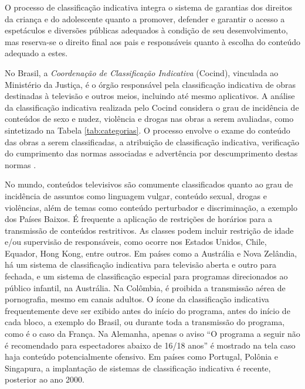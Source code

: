 
O processo de classificação indicativa integra o sistema de garantias dos direitos da criança e do adolescente quanto a promover, defender e garantir o acesso a espetáculos e diversões públicas adequados à condição de seu desenvolvimento, mas reserva-se o direito final aos pais e responsáveis quanto à escolha do conteúdo adequado a estes\cite{eca}.

No Brasil, a \emph{Coordenação de Classificação Indicativa} (Cocind), vinculada ao Ministério da Justiça, é o órgão responsável pela classificação indicativa de obras destinadas à televisão e outros meios, incluindo até mesmo aplicativos. A análise da classificação indicativa realizada pelo Cocind considera o grau de incidência de conteúdos de sexo e nudez, violência e drogas nas obras a serem avaliadas, como sintetizado na Tabela \ref{tab:categorias}. O processo envolve o exame do conteúdo das obras a serem classificadas, a atribuição de classificação indicativa, verificação do cumprimento das normas associadas e advertência por descumprimento destas normas \cite{portaria:ci}.




No mundo, conteúdos televisivos são comumente classificados quanto ao grau de incidência de assuntos como linguagem vulgar, conteúdo sexual, drogas e violências, além de temas como conteúdo perturbador e discriminação, a exemplo dos Países Baixos. É frequente a aplicação de restrições de horários para a transmissão de conteúdos restritivos. As classes podem incluir restrição de idade e/ou supervisão de responsáveis, como ocorre nos Estados Unidos, Chile, Equador, Hong Kong, entre outros. Em países como a Austrália e Nova Zelândia, há um sistema de classificação indicativa para televisão aberta e outro para fechada, e um sistema de classificação especial para programas direcionados ao público infantil, na Austrália. Na Colômbia, é proibida a transmissão aérea de pornografia, mesmo em canais adultos. O ícone da classificação indicativa frequentemente deve ser exibido antes do início do programa, antes do início de cada bloco, a exemplo do Brasil, ou durante toda a transmissão do programa, como é o caso da França.  Na Alemanha, apenas o aviso ``O programa a seguir não é recomendado para espectadores abaixo de 16/18 anos'' é mostrado na tela caso haja conteúdo potencialmente ofensivo. Em países como Portugal, Polônia e Singapura, a implantação de sistemas de classificação indicativa é recente, posterior ao ano 2000. 
